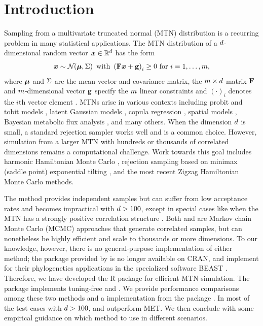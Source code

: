 \section{Introduction}
Sampling from a multivariate truncated normal (MTN) distribution is a recurring problem in many statistical applications. 
The MTN distribution of a $ d $-dimensional random vector $ \bm{x} \in \mathbb{R}^{d}$ has the form   
	\begin{equation}
	\bm{x} \sim {\cal N}\hspace{-0.25em}\left( \bm{\mu}, \Sigma\right) \text{ with } \left(\mathbf{F}\bm{x} + \mathbf{g}\right)_i \geq 0 \text{ for } i = 1, \dots, m,
	\end{equation}
	where $ \bm{\mu} $ and $ \Sigma $ are the mean vector and covariance matrix, 		
	 the $ m \times d $ matrix $ \mathbf{F} $ and $ m$-dimensional vector $ \mathbf{g} $ specify the $ m $ linear constraints and $ \left(\cdot\right)_i $ denotes the $ i$th vector element \citep{pakman2014exact}.
MTNs arise in various contexts including probit and tobit models \citep{albert1993bayesian, tobin1958estimation}, latent Gaussian models \citep{bolin2015excursion}, copula regression \citep{pitt2006efficient}, spatial models \citep{tsionas2016spatial, baltagi2018generalized, zareifard2021heterogeneous}, Bayesian metabolic flux analysis \citep{heinonen2019bayesian}, and many others.
When the dimension $ d $ is small, a standard rejection sampler \citep{geweke1991efficient, kotecha1999gibbs} works well and is a common choice.
However, simulation from a larger MTN with hundreds or thousands of correlated dimensions remains a computational challenge.
Work towards this goal includes harmonic Hamiltonian Monte Carlo \citep[\hhmc]{pakman2014exact}, rejection sampling based on minimax (saddle point) exponential tilting \citep[\mt]{botev2017normal}, and the most recent Zigzag Hamiltonian Monte Carlo \citep[\zhmc]{nishimura2020discontinuous, nishimura2024zigzag} methods.

The \mt method provides independent samples but can suffer from low acceptance rates and becomes impractical with $ d > 100 $, except in special cases like when the MTN has a strongly positive correlation structure \citep{botev2017normal}.
Both \hhmc and \zhmc are Markov chain Monte Carlo (MCMC) approaches that generate correlated samples, but can nonetheless be highly efficient and scale to thousands or more dimensions.  
To our knowledge, however, there is no general-purpose implementation of either method;
the  package provided by \citet{pakman2014exact} is no longer available on CRAN, and \citet{zhang2023accelerating} implement \zhmc for their phylogenetics applications in the specialized software BEAST \citep{beast2018}. 
Therefore, we have developed the  R package for efficient  MTN simulation.
The package implements tuning-free \zhmc and \hhmc.
We provide performance comparisons among these two methods and a \mt implementation from the  package \citep{tnpkg}.
In most of the test cases with $ d > 100 $, \hhmc and \zhmc outperform MET. 
We then conclude with some empirical guidance on which method to use in different scenarios.
